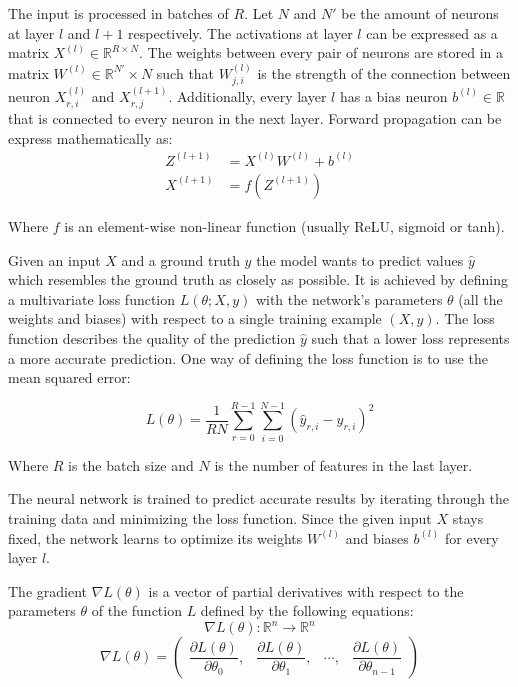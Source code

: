 \documentclass[17pt]{extarticle}
\newcommand*{\pd}[2]{\ensuremath{\dfrac{\partial #1}{\partial #2}}}
\begin{document}
\newpage

The input is processed in batches of $R$. Let $N$ and $N'$ be the amount of neurons at layer $l$ and $l+1$ respectively. The activations at layer $l$ can be expressed as a matrix $X^{(l)} \in \mathbb{R}^{R \times N}$. The weights between every pair of neurons are stored in a matrix $W^{(l)} \in \mathbb{R}^{N'}  \times N$ such that $W_{j, i}^{(l)}$ is the strength of the connection between neuron $X_{r, i}^{(l)}$ and $X_{r, j}^{(l+1)}$. Additionally, every layer $l$ has a bias neuron $b^{(l)} \in \mathbb{R}$ that is connected to every neuron in the next layer. Forward propagation can be express mathematically as:
\begin{align*}
Z^{(l+1)} & = X^{(l)}W^{(l)}+b^{(l)}\\
X^{(l+1)} & = f(Z^{(l+1)})
\end{align*}

Where $f$ is an element-wise non-linear function (usually ReLU, sigmoid or tanh).

Given an input $X$ and a ground truth $y$ the model wants to predict values $\hat{y}$ which resembles the ground truth as closely as possible. It is achieved by defining a multivariate loss function $L(\theta; X, y)$  with the network's parameters $\theta$ (all the weights and biases) with respect to a single training example $(X, y)$. The loss function describes the quality of the prediction $\hat{y}$ such that a lower loss represents a more accurate prediction. One way of defining the loss function is to use the mean squared error:

\begin{equation*}
L(\theta) = \frac{1}{RN} \sum^{R-1}_{r=0} \sum^{N-1}_{i=0} (\hat{y}_{r,i}-y_{r,i})^2
\end{equation*}

Where $R$ is the batch size and $N$ is the number of features in the last layer.

The neural network is trained to predict accurate results by iterating through the training data and minimizing the loss function. Since the given input $X$ stays fixed, the network learns to optimize its weights $W^{(l)}$ and biases $b^{(l)}$ for every layer $l$.

\newpage


The gradient $\nabla L(\theta)$ is a vector of partial derivatives with respect to the parameters $\theta$ of the function $L$ defined by the following equations:
\begin{equation*}\label{EQgradientspace}
\nabla L(\theta) : \mathbb{R}^n \to \mathbb{R}^n
\end{equation*}
\begin{equation*}\label{EQgradientvector}
\nabla L(\theta) = 
	\begin{pmatrix} 
		\pd{L(\theta)}{\theta_{0}}, & 
		\pd{L(\theta)}{\theta_{1}}, &
		\cdots, &
		\pd{L(\theta)}{\theta_{n-1}}
		
		\end{pmatrix}
\end{equation*}
\end{document}
